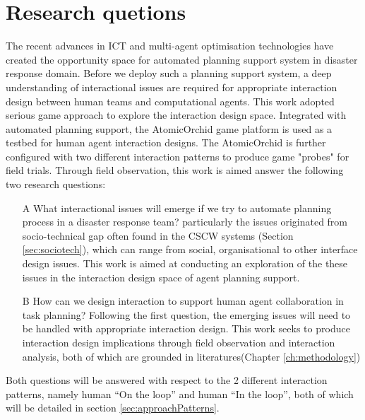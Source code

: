 \section{Research quetions}
The recent advances in \ac{ICT} and multi-agent optimisation technologies have created the opportunity space for automated planning support system in disaster response domain. Before we deploy such a planning support system, a deep understanding of interactional issues are required for appropriate interaction design between human teams and computational agents. This work adopted serious game approach to explore the interaction design space. Integrated with automated planning support, the AtomicOrchid game platform is used as a testbed for human agent interaction designs.  The AtomicOrchid is further configured with two different interaction patterns to produce game "probes" for field trials. Through field observation, this work is aimed answer the following two research questions:

\begin{enumerate}
\item[A] What interactional issues will emerge if we try to automate planning process in a disaster response team? particularly the issues originated from socio-technical gap often found in the \ac{CSCW} systems (Section \ref{sec:sociotech}), which can range from social, organisational to other interface design issues. This work is aimed at conducting an exploration of the these issues in the interaction design space of agent planning support.

\item[B] How can we design interaction to support human agent collaboration in task planning?
Following the first question, the emerging issues will need to be handled with appropriate interaction design. This work seeks to produce interaction design implications through field observation and interaction analysis, both of which are grounded in literatures(Chapter \ref{ch:methodology})
\end{enumerate}

Both questions will be answered with respect to the 2 different interaction patterns, namely human ``On the loop'' and human ``In the loop'', both of which will be detailed in section \ref{sec:approachPatterns}. 

